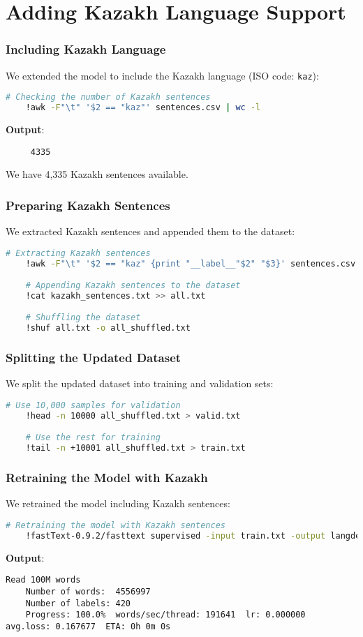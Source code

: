 \documentclass{beamer}
\begin{document}
\section{Adding Kazakh Language Support}

\begin{frame}[fragile]
    \frametitle{Including Kazakh Language}
    We extended the model to include the Kazakh language (ISO code: \texttt{kaz}):
    \begin{lstlisting}[language=bash]
    # Checking the number of Kazakh sentences
    !awk -F"\t" '$2 == "kaz"' sentences.csv | wc -l
    \end{lstlisting}
    \textbf{Output}:
    \begin{lstlisting}
     4335
    \end{lstlisting}
    We have 4,335 Kazakh sentences available.
\end{frame}

\begin{frame}[fragile]
    \frametitle{Preparing Kazakh Sentences}
    We extracted Kazakh sentences and appended them to the dataset:
    \begin{lstlisting}[language=bash]
    # Extracting Kazakh sentences
    !awk -F"\t" '$2 == "kaz" {print "__label__"$2" "$3}' sentences.csv > kazakh_sentences.txt

    # Appending Kazakh sentences to the dataset
    !cat kazakh_sentences.txt >> all.txt

    # Shuffling the dataset
    !shuf all.txt -o all_shuffled.txt
    \end{lstlisting}
\end{frame}

\begin{frame}[fragile]
    \frametitle{Splitting the Updated Dataset}
    We split the updated dataset into training and validation sets:
    \begin{lstlisting}[language=bash]
    # Use 10,000 samples for validation
    !head -n 10000 all_shuffled.txt > valid.txt

    # Use the rest for training
    !tail -n +10001 all_shuffled.txt > train.txt
    \end{lstlisting}
\end{frame}

\begin{frame}[fragile]
    \frametitle{Retraining the Model with Kazakh}
    We retrained the model including Kazakh sentences:
    \begin{lstlisting}[language=bash]
    # Retraining the model with Kazakh sentences
    !fastText-0.9.2/fasttext supervised -input train.txt -output langdetect -dim 16
    \end{lstlisting}
    \textbf{Output}:
    \begin{lstlisting}[basicstyle=\ttfamily\scriptsize]
    Read 100M words
    Number of words:  4556997
    Number of labels: 420
    Progress: 100.0%  words/sec/thread: 191641  lr: 0.000000  avg.loss: 0.167677  ETA: 0h 0m 0s
    \end{lstlisting}
\end{frame}
\end{document}
